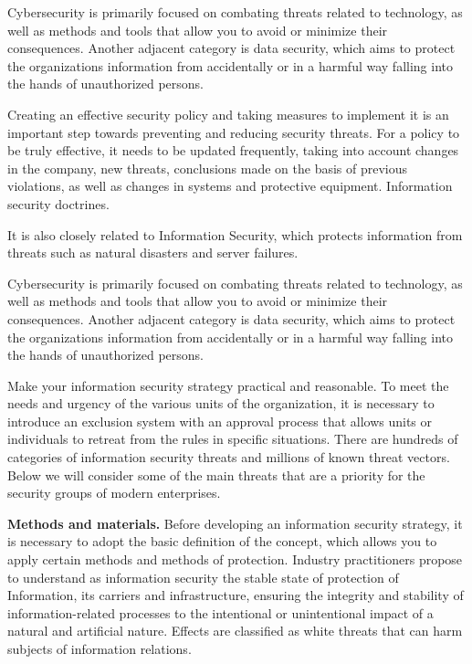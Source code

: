 Cybersecurity is primarily focused on combating threats related to
technology, as well as methods and tools that allow you to avoid or
minimize their consequences. Another adjacent category is data security,
which aims to protect the organization\textquotesingle s information
from accidentally or in a harmful way falling into the hands of
unauthorized persons.

Creating an effective security policy and taking measures to implement
it is an important step towards preventing and reducing security
threats. For a policy to be truly effective, it needs to be updated
frequently, taking into account changes in the company, new threats,
conclusions made on the basis of previous violations, as well as changes
in systems and protective equipment. Information security doctrines.

It is also closely related to Information Security, which protects
information from threats such as natural disasters and server failures.

Cybersecurity is primarily focused on combating threats related to
technology, as well as methods and tools that allow you to avoid or
minimize their consequences. Another adjacent category is data security,
which aims to protect the organization\textquotesingle s information
from accidentally or in a harmful way falling into the hands of
unauthorized persons.

Make your information security strategy practical and reasonable. To
meet the needs and urgency of the various units of the organization, it
is necessary to introduce an exclusion system with an approval process
that allows units or individuals to retreat from the rules in specific
situations. There are hundreds of categories of information security
threats and millions of known threat vectors. Below we will consider
some of the main threats that are a priority for the security groups of
modern enterprises.

\textbf{Methods and materials.} Before developing an information
security strategy, it is necessary to adopt the basic definition of the
concept, which allows you to apply certain methods and methods of
protection. Industry practitioners propose to understand as information
security the stable state of protection of Information, its carriers and
infrastructure, ensuring the integrity and stability of
information-related processes to the intentional or unintentional impact
of a natural and artificial nature. Effects are classified as white
threats that can harm subjects of information relations.

